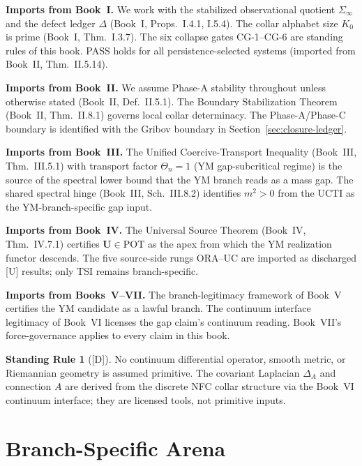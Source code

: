 \documentclass[12pt,oneside]{amsbook}
\theoremstyle{plain}
\theoremstyle{definition}
\newtheorem{standingrule}[theorem]{Standing Rule}
\theoremstyle{remark}
\newcommand{\status}[1]{\textup{[#1]}}
\begin{document}
\textbf{Imports from Book~I.} We work with the stabilized
observational quotient $\Sigma_\infty$ and the defect ledger
$\Delta$ (Book~I, Props.~I.4.1, I.5.4). The collar alphabet size
$K_0$ is prime (Book~I, Thm.~I.3.7). The six collapse gates
CG-1--CG-6 are standing rules of this book. PASS holds for all
persistence-selected systems (imported from Book~II,
Thm.~II.5.14).

\textbf{Imports from Book~II.} We assume Phase-A stability
throughout unless otherwise stated (Book~II, Def.~II.5.1). The
Boundary Stabilization Theorem (Book~II, Thm.~II.8.1) governs
local collar determinacy. The Phase-A/Phase-C boundary is
identified with the Gribov boundary in Section~\ref{sec:closure-ledger}.

\textbf{Imports from Book~III.} The Unified Coercive-Transport
Inequality (Book~III, Thm.~III.5.1) with transport factor
$\Theta_n = 1$ (YM gap-subcritical regime) is the source of the
spectral lower bound that the YM branch reads as a mass gap. The
shared spectral hinge (Book~III, Sch.~III.8.2) identifies $m^2>0$
from the UCTI as the YM-branch-specific gap input.

\textbf{Imports from Book~IV.} The Universal Source Theorem
(Book~IV, Thm.~IV.7.1) certifies $\mathbf{U} \in \mathrm{POT}$
as the apex from which the YM realization functor descends. The
five source-side rungs ORA--UC are imported as discharged [U]
results; only TSI remains branch-specific.

\textbf{Imports from Books~V--VII.} The branch-legitimacy
framework of Book~V certifies the YM candidate as a lawful branch.
The continuum interface legitimacy of Book~VI licenses the gap
claim's continuum reading. Book~VII's force-governance applies to
every claim in this book.

\begin{standingrule}[\status{D}]\label{sr:ym-no-continuum-smuggle}
No continuum differential operator, smooth metric, or Riemannian
geometry is assumed primitive. The covariant Laplacian $\Delta_A$
and connection $A$ are derived from the discrete NFC collar
structure via the Book~VI continuum interface; they are licensed
tools, not primitive inputs.
\end{standingrule}

\section{Branch-Specific Arena}
\label{sec:arena}
\end{document}
